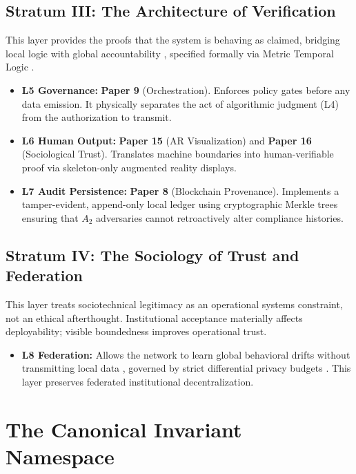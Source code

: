 \documentclass[conference]{IEEEtran}
\begin{document}
\subsection{Stratum III: The Architecture of Verification}
This layer provides the proofs that the system is behaving as claimed, bridging local logic with global accountability \cite{b_clarke}, specified formally via Metric Temporal Logic \cite{b_koymans}.
\begin{itemize}
    \item \textbf{L5 Governance:} \textbf{Paper 9} (Orchestration). Enforces policy gates before any data emission. It physically separates the act of algorithmic judgment (L4) from the authorization to transmit.
    \item \textbf{L6 Human Output:} \textbf{Paper 15} (AR Visualization) and \textbf{Paper 16} (Sociological Trust). Translates machine boundaries into human-verifiable proof via skeleton-only augmented reality displays.
    \item \textbf{L7 Audit Persistence:} \textbf{Paper 8} (Blockchain Provenance). Implements a tamper-evident, append-only local ledger using cryptographic Merkle trees \cite{b_merkle} ensuring that $A_2$ adversaries cannot retroactively alter compliance histories.
\end{itemize}

\subsection{Stratum IV: The Sociology of Trust and Federation}
This layer treats sociotechnical legitimacy as an operational systems constraint, not an ethical afterthought. Institutional acceptance materially affects deployability; visible boundedness improves operational trust.
\begin{itemize}
    \item \textbf{L8 Federation:} Allows the network to learn global behavioral drifts without transmitting local data \cite{b_mcmahan}, governed by strict differential privacy budgets \cite{b_dwork}. This layer preserves federated institutional decentralization.
\end{itemize}

\section{The Canonical Invariant Namespace}
\end{document}
